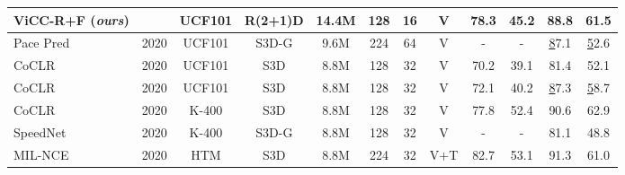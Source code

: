 \documentclass[10pt,twocolumn,letterpaper]{article}
\newcommand\Tstrut{\rule{0pt}{2.2ex}}         \newcommand\Bstrut{\rule[-0.9ex]{0pt}{0pt}}   \usepackage{booktabs}
\begin{document}
\begin{table*}
\begin{center}
{\begin{tabular}{lccccccccccc}
\textbf{ViCC-R+F} (\textit{ours})               &		                      & UCF101                         & R(2+1)D                         & 14.4M                        & 128                        & 16 
& V                        &	\textbf{78.3}	 &      \textbf{45.2}	       	& \textbf{88.8}               &    \textbf{61.5}                          \\ \hline \Tstrut
Pace Pred \cite{wang_self-supervised_2020} 							& 2020                   	  & UCF101                         & S3D-G                           & 9.6M                         & 224                        & 64                        & V          &	-	 &  -                 & {\ul 87.1}                  & {\ul 52.6}                  \\
CoCLR  \cite{han_self-supervised_2020}                            	& 2020                        & UCF101                         & S3D                             & 8.8M                         & 128                        & 32                        & V            &	70.2	 &  39.1               & 81.4                        & 52.1                        \\
CoCLR  \cite{han_self-supervised_2020} 								& 2020                        & UCF101                         & S3D                             & 8.8M                         & 128                        & 32                        & V             &	72.1	 &  40.2               & {\ul 87.3}                  & {\ul 58.7}                  \\
{\color[HTML]{9B9B9B} CoCLR  \cite{han_self-supervised_2020}}      	& {\color[HTML]{9B9B9B} 2020} & {\color[HTML]{9B9B9B} K-400} & {\color[HTML]{9B9B9B} S3D}      & {\color[HTML]{9B9B9B} 8.8M}  & {\color[HTML]{9B9B9B} 128} & {\color[HTML]{9B9B9B} 32} & {\color[HTML]{9B9B9B} V}   & {\color[HTML]{9B9B9B} 77.8} & {\color[HTML]{9B9B9B} 52.4} & {\color[HTML]{9B9B9B} 90.6} & {\color[HTML]{9B9B9B} 62.9} \\
{\color[HTML]{9B9B9B} SpeedNet \cite{benaim_speednet_2020}}      	& {\color[HTML]{9B9B9B} 2020} & {\color[HTML]{9B9B9B} K-400} & {\color[HTML]{9B9B9B} S3D-G}      & {\color[HTML]{9B9B9B} 8.8M}  & {\color[HTML]{9B9B9B} 128} & {\color[HTML]{9B9B9B} 32} & {\color[HTML]{9B9B9B} V}   & {\color[HTML]{9B9B9B} -} & {\color[HTML]{9B9B9B} -} & {\color[HTML]{9B9B9B} 81.1} & {\color[HTML]{9B9B9B} 48.8} \\ 
{\color[HTML]{9B9B9B} MIL-NCE \cite{miech_end--end_2020}}     		& {\color[HTML]{9B9B9B} 2020} & {\color[HTML]{9B9B9B} HTM \cite{miech_howto100m_2019}}   & {\color[HTML]{9B9B9B} S3D}      & {\color[HTML]{9B9B9B} 8.8M}  & {\color[HTML]{9B9B9B} 224} & {\color[HTML]{9B9B9B} 32} & {\color[HTML]{9B9B9B} V+T} & {\color[HTML]{9B9B9B} 82.7} & {\color[HTML]{9B9B9B} 53.1}& {\color[HTML]{9B9B9B} 91.3} & {\color[HTML]{9B9B9B} 61.0} \\

\end{tabular}}
\end{center}
\end{table*}
\end{document}
